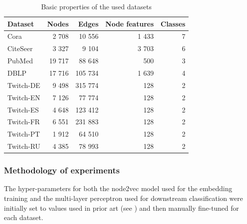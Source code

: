 \begin{table}
  \begin{center}
    \begin{minipage}{280pt} %
      \caption{Basic properties of the used datasets}
      \label{tab:dataset-sizes}
      \begin{tabular}{lrrrr}
        \toprule
        \textbf{Dataset} & \textbf{Nodes} & \textbf{Edges} & \textbf{Node features} & \textbf{Classes} \\
        \midrule
        Cora             & 2 708          & 10 556         & 1 433                  & 7                \\
        CiteSeer         & 3 327          & 9 104          & 3 703                  & 6                \\
        PubMed           & 19 717         & 88 648         & 500                    & 3                \\
        DBLP             & 17 716         & 105 734        & 1 639                  & 4                \\
        Twitch-DE        & 9 498          & 315 774        & 128                    & 2                \\
        Twitch-EN        & 7 126          & 77 774         & 128                    & 2                \\
        Twitch-ES        & 4 648          & 123 412        & 128                    & 2                \\
        Twitch-FR        & 6 551          & 231 883        & 128                    & 2                \\
        Twitch-PT        & 1 912          & 64 510         & 128                    & 2                \\
        Twitch-RU        & 4 385          & 78 993         & 128                    & 2                \\
        \bottomrule
      \end{tabular}
    \end{minipage}
  \end{center}
\end{table}

\subsubsection{Methodology of experiments}

The hyper-parameters for both the node2vec model used for the embedding training and the multi-layer perceptron used for downstream classification were initially set to values used in prior art (see \cite{hu_open_2021, fey_fast_2019}) and then manually fine-tuned for each dataset.

